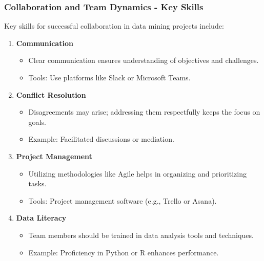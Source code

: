 \documentclass[aspectratio=169]{beamer}
\begin{document}
\begin{frame}[fragile]
    \frametitle{Collaboration and Team Dynamics - Key Skills}
    Key skills for successful collaboration in data mining projects include:

    \begin{enumerate}
        \item \textbf{Communication}
            \begin{itemize}
                \item Clear communication ensures understanding of objectives and challenges.
                \item Tools: Use platforms like Slack or Microsoft Teams.
            \end{itemize}
        \item \textbf{Conflict Resolution}
            \begin{itemize}
                \item Disagreements may arise; addressing them respectfully keeps the focus on goals.
                \item Example: Facilitated discussions or mediation.
            \end{itemize}
        \item \textbf{Project Management}
            \begin{itemize}
                \item Utilizing methodologies like Agile helps in organizing and prioritizing tasks.
                \item Tools: Project management software (e.g., Trello or Asana).
            \end{itemize}
        \item \textbf{Data Literacy}
            \begin{itemize}
                \item Team members should be trained in data analysis tools and techniques.
                \item Example: Proficiency in Python or R enhances performance.
            \end{itemize}
    \end{enumerate}
\end{frame}
\end{document}
